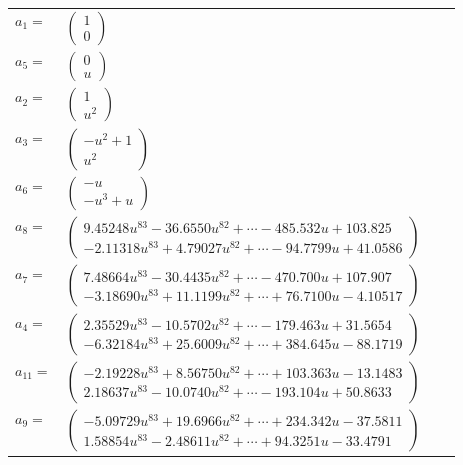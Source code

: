 \documentclass[1p]{elsarticle_modified}
\theoremstyle{definition}
\begin{document}
\begin{tabular}{m{7pt} m{180pt} m{7pt} m{180pt} }
\flushright $a_{1}=$&$\begin{pmatrix}1\\0\end{pmatrix}$ \\
\flushright $a_{5}=$&$\begin{pmatrix}0\\u\end{pmatrix}$ \\
\flushright $a_{2}=$&$\begin{pmatrix}1\\u^2\end{pmatrix}$ \\
\flushright $a_{3}=$&$\begin{pmatrix}- u^2+1\\u^2\end{pmatrix}$ \\
\flushright $a_{6}=$&$\begin{pmatrix}- u\\- u^3+u\end{pmatrix}$ \\
\flushright $a_{8}=$&$\begin{pmatrix}9.45248 u^{83}-36.6550 u^{82}+\cdots-485.532 u+103.825\\-2.11318 u^{83}+4.79027 u^{82}+\cdots-94.7799 u+41.0586\end{pmatrix}$ \\
\flushright $a_{7}=$&$\begin{pmatrix}7.48664 u^{83}-30.4435 u^{82}+\cdots-470.700 u+107.907\\-3.18690 u^{83}+11.1199 u^{82}+\cdots+76.7100 u-4.10517\end{pmatrix}$ \\
\flushright $a_{4}=$&$\begin{pmatrix}2.35529 u^{83}-10.5702 u^{82}+\cdots-179.463 u+31.5654\\-6.32184 u^{83}+25.6009 u^{82}+\cdots+384.645 u-88.1719\end{pmatrix}$ \\
\flushright $a_{11}=$&$\begin{pmatrix}-2.19228 u^{83}+8.56750 u^{82}+\cdots+103.363 u-13.1483\\2.18637 u^{83}-10.0740 u^{82}+\cdots-193.104 u+50.8633\end{pmatrix}$ \\
\flushright $a_{9}=$&$\begin{pmatrix}-5.09729 u^{83}+19.6966 u^{82}+\cdots+234.342 u-37.5811\\1.58854 u^{83}-2.48611 u^{82}+\cdots+94.3251 u-33.4791\end{pmatrix}$ \\

\end{tabular}
\end{document}
